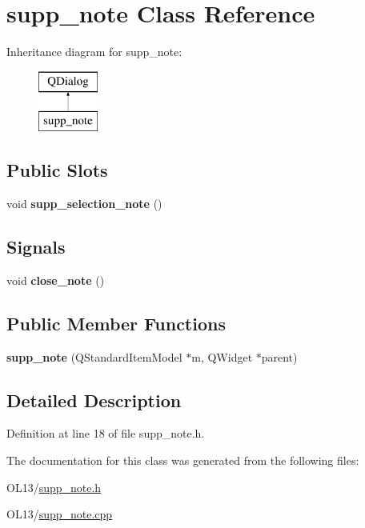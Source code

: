 \hypertarget{classsupp__note}{}\section{supp\+\_\+note Class Reference}
\label{classsupp__note}
Inheritance diagram for supp\+\_\+note\+:\begin{figure}[H]
\begin{center}
\leavevmode
\includegraphics[height=2.000000cm]{classsupp__note}
\end{center}
\end{figure}
\subsection*{Public Slots}
\begin{DoxyCompactItemize}
\item 
\mbox{\label{classsupp__note_a5dbf6d3af5c94d71f42eeb2cf626c9d3}} 
void {\bfseries supp\+\_\+selection\+\_\+note} ()
\end{DoxyCompactItemize}
\subsection*{Signals}
\begin{DoxyCompactItemize}
\item 
\mbox{\label{classsupp__note_a0a45d0adbe61d17cb5d088103955da7c}} 
void {\bfseries close\+\_\+note} ()
\end{DoxyCompactItemize}
\subsection*{Public Member Functions}
\begin{DoxyCompactItemize}
\item 
\mbox{\label{classsupp__note_a0a8f0c351866f8026cabfd981b919889}} 
{\bfseries supp\+\_\+note} (Q\+Standard\+Item\+Model $\ast$m, Q\+Widget $\ast$parent)
\end{DoxyCompactItemize}


\subsection{Detailed Description}


Definition at line 18 of file supp\+\_\+note.\+h.



The documentation for this class was generated from the following files\+:\begin{DoxyCompactItemize}
\item 
O\+L13/\hyperlink{supp__note_8h}{supp\+\_\+note.\+h}\item 
O\+L13/\hyperlink{supp__note_8cpp}{supp\+\_\+note.\+cpp}\end{DoxyCompactItemize}
